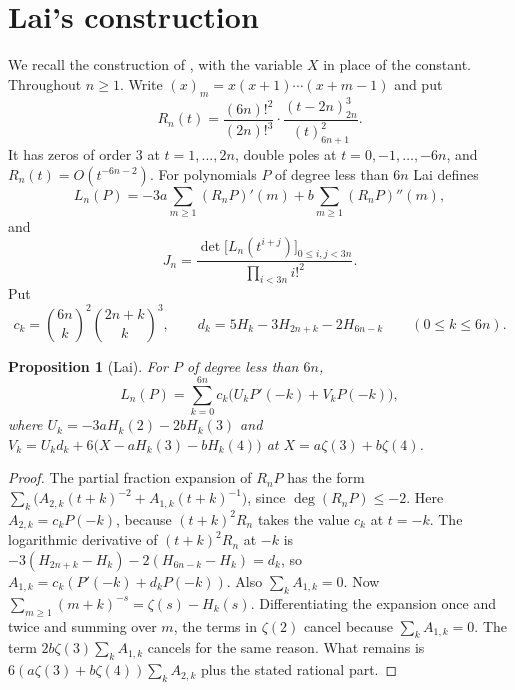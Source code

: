 \documentclass[11pt]{amsart}
\newtheorem{proposition}[theorem]{Proposition}
\theoremstyle{definition}
\theoremstyle{remark}
\numberwithin{equation}{section}
\begin{document}
\section{Lai's construction}\label{sec:construction}

We recall the construction of \cite[\S2]{Lai2026}, with the variable $X$ in place of the constant. Throughout $n\ge1$.
Write $(x)_m=x(x+1)\cdots(x+m-1)$ and put
\[
 R_n(t)=\frac{(6n)!^2}{(2n)!^3}\cdot\frac{(t-2n)_{2n}^3}{(t)_{6n+1}^2}.
\]
It has zeros of order $3$ at $t=1,\dots,2n$, double poles at $t=0,-1,\dots,-6n$, and $R_n(t)=O(t^{-6n-2})$. For
polynomials $P$ of degree less than $6n$ Lai defines
\begin{equation}\label{eq:Lseries}
 L_n(P)=-3a\sum_{m\ge1}(R_nP)'(m)+b\sum_{m\ge1}(R_nP)''(m),
\end{equation}
and
\[
 J_n=\frac{\det\bigl[L_n(t^{i+j})\bigr]_{0\le i,j<3n}}{\prod_{i<3n}i!^2}.
\]
Put
\[
 c_k=\binom{6n}k^2\binom{2n+k}k^3,\qquad d_k=5H_k-3H_{2n+k}-2H_{6n-k}\qquad(0\le k\le6n).
\]

\begin{proposition}[Lai]\label{prop:finite}
For $P$ of degree less than $6n$,
\begin{equation}\label{eq:finite}
 L_n(P)=\sum_{k=0}^{6n}c_k\bigl(U_kP'(-k)+V_kP(-k)\bigr),
\end{equation}
where $U_k=-3aH_k(2)-2bH_k(3)$ and $V_k=U_kd_k+6\bigl(X-aH_k(3)-bH_k(4)\bigr)$ at $X=a\zeta(3)+b\zeta(4)$.
\end{proposition}

\begin{proof}
The partial fraction expansion of $R_nP$ has the form
$\sum_k\bigl(A_{2,k}(t+k)^{-2}+A_{1,k}(t+k)^{-1}\bigr)$, since $\deg(R_nP)\le-2$. Here
$A_{2,k}=c_kP(-k)$, because $(t+k)^2R_n$ takes the value $c_k$ at $t=-k$. The logarithmic derivative of
$(t+k)^2R_n$ at $-k$ is $-3(H_{2n+k}-H_k)-2(H_{6n-k}-H_k)=d_k$, so $A_{1,k}=c_k(P'(-k)+d_kP(-k))$. Also
$\sum_kA_{1,k}=0$. Now $\sum_{m\ge1}(m+k)^{-s}=\zeta(s)-H_k(s)$. Differentiating the expansion once and twice and
summing over $m$, the terms in $\zeta(2)$ cancel because $\sum_kA_{1,k}=0$. The term $2b\zeta(3)\sum_kA_{1,k}$
cancels for the same reason. What remains is $6(a\zeta(3)+b\zeta(4))\sum_kA_{2,k}$ plus the stated rational part.
\end{proof}
\end{document}

